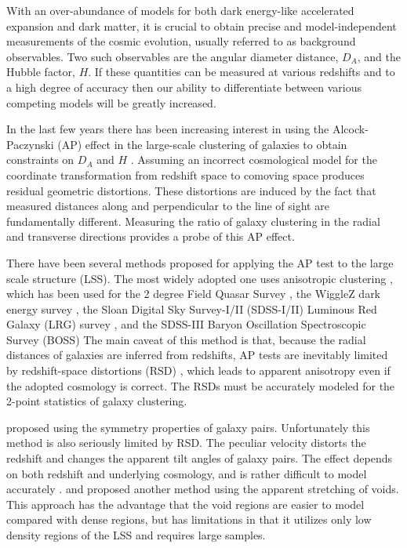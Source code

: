 \documentclass[iop]{emulateapj}
\begin{document}
With an over-abundance of models for both dark energy-like accelerated expansion and dark matter, 
it is crucial to obtain precise and model-independent measurements of the cosmic evolution, usually referred to as background observables. 
Two such observables are the angular diameter distance, $D_A$, and the Hubble factor, $H$.  
If these quantities can be measured at various redshifts and to a high degree of accuracy then our ability to differentiate between various competing models will be greatly increased.

In the last few years there has been increasing interest in using the Alcock-Paczynski (AP) effect \citep{AP1979} 
in the large-scale clustering of galaxies to obtain constraints on $D_A$ and $H$ \citep{Guzzo2008,topology}. 
Assuming an incorrect cosmological model for the coordinate transformation from redshift space to comoving space produces residual geometric distortions. 
These distortions are induced by the fact that measured distances along and perpendicular to the line of sight are fundamentally different. 
Measuring the ratio of galaxy clustering in the radial and transverse directions provides a probe of this AP effect.

There have been several methods proposed for applying the AP test to the large scale structure (LSS).
The most widely adopted one uses anisotropic clustering \citep{Ballinger1996,Matsubara1996},
which has been used for the 2 degree Field Quasar Survey \citep{Outram2004},
the WiggleZ dark energy survey \citep{Blake2011}, 
the Sloan Digital Sky Survey-I/II (SDSS-I/II) Luminous Red Galaxy (LRG) survey \citep{Eisenstein et al. 2011,ChuangWang2012},
and the SDSS-III Baryon Oscillation Spectroscopic Survey (BOSS) 
\citep{Reid2012,Beutler2013,Linder2013,2014arXiv1407.2257S, 2014ApJ...781...96L,
Alam2016, Beutler2016, Sanchez2016}
The main caveat of this method is that,
because the radial distances of galaxies are inferred from redshifts,
AP tests are inevitably limited by redshift-space distortions (RSD) \citep{Ballinger1996},
which leads to apparent anisotropy even if the adopted cosmology is correct.
The RSDs must be accurately modeled for the 2-point statistics of galaxy clustering.


\cite{Marinoni2010} proposed using the symmetry properties of galaxy pairs.
Unfortunately this method is also seriously limited by RSD.
The peculiar velocity distorts the redshift and changes the apparent tilt angles of galaxy pairs.
The effect depends on both redshift and underlying cosmology, and is rather difficult to model accurately \citep{Jennings2011}.
\cite{Ryden1995} and \cite{LavausWandelt1995} proposed another method using the apparent stretching of voids.
This approach has the advantage that the void regions are easier to model compared with dense regions,
but has limitations in that it utilizes only low density regions of the LSS
and requires large samples.
\end{document}
